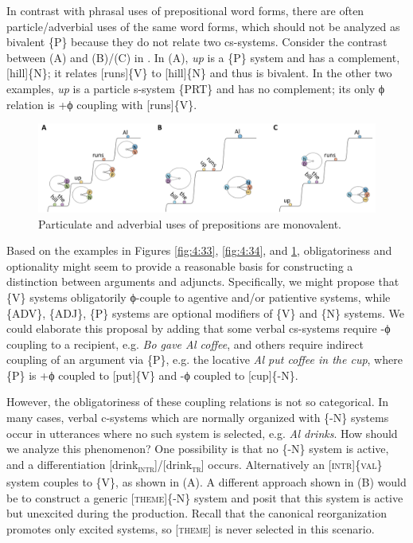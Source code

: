   In contrast with phrasal uses of prepositional word forms, there are often particle/adverbial uses of the same word forms, which should not be analyzed as bivalent \{P\} because they do not relate two cs-systems. Consider the contrast between (A) and (B)/(C) in {}. In (A), \textit{up} is a \{P\} system and has a complement, [hill]\{N\}; it relates [runs]\{V\} to [hill]\{N\} and thus is bivalent. In the other two examples, \textit{up} is a particle s-system \{PRT\} and has no complement; its only ϕ relation is +ϕ coupling with [runs]\{V\}.

  
\begin{figure}
\includegraphics[width=\textwidth]{figures/Tilsen-img85.png}
\caption{Particulate and adverbial uses of prepositions are monovalent.}
\label{fig:4:35}
\end{figure}
 

  Based on the examples in Figures {\ref{fig:4:33}}, {\ref{fig:4:34}}, and {\ref{fig:4:35}}, obligatoriness and optionality might seem to provide a reasonable basis for constructing a distinction between arguments and adjuncts. Specifically, we might propose that \{V\} systems obligatorily ϕ-couple to agentive and/or patientive systems, while \{ADV\}, \{ADJ\}, \{P\} systems are optional modifiers of \{V\} and \{N\} systems. We could elaborate this proposal by adding that some verbal cs-systems require -ϕ coupling to a recipient, e.g. \textit{Bo gave Al coffee}, and others require indirect coupling of an argument via \{P\}, e.g. the locative \textit{Al put coffee in the cup}, where \{P\} is +ϕ coupled to [put]\{V\} and -ϕ coupled to [cup]\{-N\}.

  However, the obligatoriness of these coupling relations is not so categorical. In many cases, verbal c-systems which are normally organized with \{-N\} systems occur in utterances where no such system is selected, e.g. \textit{Al drinks}. How should we analyze this phenomenon? One possibility is that no \{-N\} system is active, and a differentiation [drink\textsc{\textsubscript{intr}}]/[drink\textsc{\textsubscript{tr}}] occurs. Alternatively an [\textsc{intr}]\{\textsc{val}\} system couples to \{V\}, as shown in {}(A). A different approach shown in (B) would be to construct a generic [\textsc{theme}]\{-N\} system and posit that this system is active but unexcited during the production. Recall that the canonical reorganization promotes only excited systems, so [\textsc{theme}] is never selected in this scenario. 

